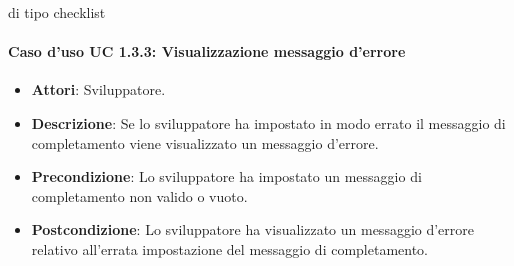 di tipo checklist\paragraph{Caso d'uso UC 1.3.3: Visualizzazione messaggio d'errore}

\FloatBarrier
\begin{itemize}
\item\textbf{Attori}: Sviluppatore.
\item\textbf{Descrizione}: Se lo sviluppatore ha impostato in modo errato il messaggio di completamento viene visualizzato un messaggio d'errore.
\item\textbf{Precondizione}: Lo sviluppatore ha impostato un messaggio di completamento non valido o vuoto.
\item\textbf{Postcondizione}: Lo sviluppatore ha visualizzato un messaggio d'errore relativo all'errata impostazione del messaggio di completamento.
\end{itemize}
